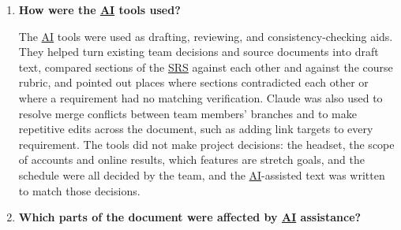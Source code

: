 \documentclass[12pt]{article}
\begin{document}
\begin{enumerate}
    \item \textbf{How were the \hyperlink{glos:AI}{AI} tools used?}

    The \hyperlink{glos:AI}{AI} tools were used as drafting, reviewing, and consistency-checking
    aids. They helped turn existing team decisions and source documents into
    draft text, compared sections of the \hyperlink{glos:SRS}{SRS} against each other and against the
    course rubric, and pointed out places where sections contradicted each
    other or where a requirement had no matching verification. Claude was also
    used to resolve merge conflicts between team members' branches and to make
    repetitive edits across the document, such as adding link targets to every
    requirement. The tools did not make project decisions: the headset, the
    scope of accounts and online results, which features are stretch goals,
    and the schedule were all decided by the team, and the \hyperlink{glos:AI}{AI}-assisted text
    was written to match those decisions.

    \item \textbf{Which parts of the document were affected by \hyperlink{glos:AI}{AI} assistance?}


\end{enumerate}
\end{document}
